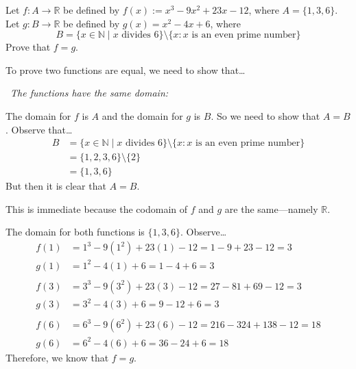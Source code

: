 \documentclass[11pt,letterpaper]{article}
\begin{document}

 Let $f: A \to \mathbb{R}$ be defined by $f(x):= x^3 - 9x^2 + 23x - 12$, where $A= \{ 1, 3, 6 \}$. Let $g: B \to \mathbb{R}$ be defined by $g(x)= x^2 - 4x + 6$, where 
	\[
	B= \{ x \in \mathbb{N} \;|\; x \text{ divides }6 \} \setminus \{x \colon x \text{ is an even prime number} \}
	\]
Prove that $f= g$. \pspace

\sol To prove two functions are equal, we need to show that\dots

\textbullet\ {\itshape The functions have the same domain:}

The domain for $f$ is $A$ and the domain for $g$ is $B$. So we need to show that $A= B$. Observe that\dots
	\[
	\begin{aligned}
	B&= \{ x \in \mathbb{N} \;|\; x \text{ divides }6 \} \setminus \{x \colon x \text{ is an even prime number} \} \\
	&= \{ 1, 2, 3, 6 \} \setminus \{ 2 \} \\
	&= \{ 1, 3, 6 \}
	\end{aligned}
	\]
But then it is clear that $A= B$. \pspace

 \pspace

This is immediate because the codomain of $f$ and $g$ are the same---namely $\mathbb{R}$. \pspace

 \pspace

The domain for both functions is $\{ 1, 3, 6 \}$. Observe\dots
	\[
	\begin{aligned}
	f(1)&= 1^3 - 9(1^2) + 23(1) - 12= 1 - 9 + 23 - 12= 3 \\
	g(1)&= 1^2 - 4(1) + 6= 1 - 4 + 6= 3 \\
	\\
	f(3)&= 3^3 - 9(3^2) + 23(3) - 12= 27 - 81 + 69 - 12= 3 \\
	g(3)&= 3^2 - 4(3) + 6= 9 - 12 + 6= 3 \\
	\\
	f(6)&= 6^3 - 9(6^2) + 23(6) - 12= 216 - 324 + 138 - 12= 18 \\
	g(6)&= 6^2 - 4(6) + 6= 36 - 24 + 6= 18
	\end{aligned}
	\] \pspace
Therefore, we know that $f= g$. 



\newpage
\end{document}

